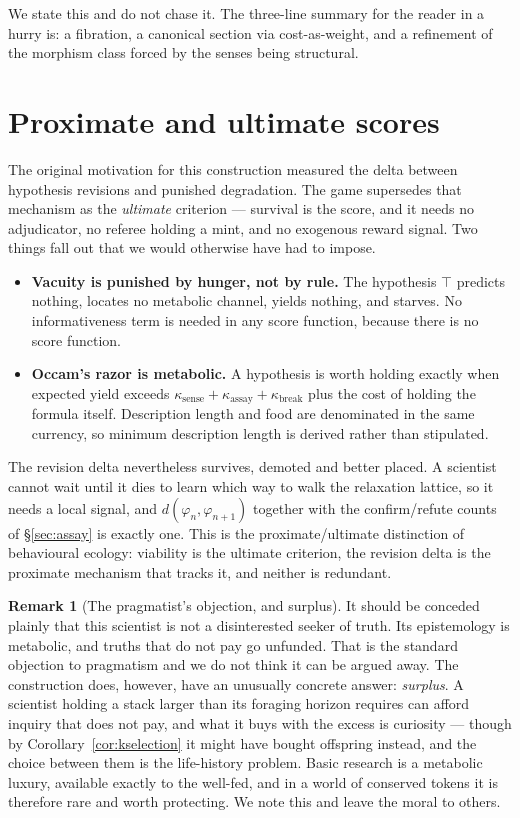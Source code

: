 \documentclass[11pt]{article}
\theoremstyle{plain}
\theoremstyle{definition}
\newtheorem{remark}[theorem]{Remark}
\begin{document}
We state this and do not chase it. The three-line summary for the reader in a hurry is: a fibration, a
canonical section via cost-as-weight, and a refinement of the morphism class forced by the senses being
structural.

\section{Proximate and ultimate scores}
\label{sec:scores}

The original motivation for this construction measured the delta between hypothesis revisions and
punished degradation. The game supersedes that mechanism as the \emph{ultimate} criterion --- survival
is the score, and it needs no adjudicator, no referee holding a mint, and no exogenous reward signal.
Two things fall out that we would otherwise have had to impose.

\begin{itemize}
\item \textbf{Vacuity is punished by hunger, not by rule.} The hypothesis $\top$ predicts nothing,
locates no metabolic channel, yields nothing, and starves. No informativeness term is needed in any
score function, because there is no score function.
\item \textbf{Occam's razor is metabolic.} A hypothesis is worth holding exactly when expected yield
exceeds $\kappa_{\mathrm{sense}} + \kappa_{\mathrm{assay}} + \kappa_{\mathrm{break}}$ plus the cost of
holding the formula itself. Description length and food are denominated in the same currency, so
minimum description length is derived rather than stipulated.
\end{itemize}

The revision delta nevertheless survives, demoted and better placed. A scientist cannot wait until it
dies to learn which way to walk the relaxation lattice, so it needs a local signal, and
$d(\varphi_n, \varphi_{n+1})$ together with the confirm/refute counts of \S\ref{sec:assay} is exactly
one. This is the proximate/ultimate distinction of behavioural ecology: viability is the ultimate
criterion, the revision delta is the proximate mechanism that tracks it, and neither is redundant.

\begin{remark}[The pragmatist's objection, and surplus]
\label{rem:pragmatist}
It should be conceded plainly that this scientist is not a disinterested seeker of truth. Its
epistemology is metabolic, and truths that do not pay go unfunded. That is the standard objection to
pragmatism and we do not think it can be argued away. The construction does, however, have an unusually
concrete answer: \emph{surplus}. A scientist holding a stack larger than its foraging horizon requires
can afford inquiry that does not pay, and what it buys with the excess is curiosity --- though by
Corollary~\ref{cor:kselection} it might have bought offspring instead, and the choice between them is
the life-history problem. Basic research is
a metabolic luxury, available exactly to the well-fed, and in a world of conserved tokens it is
therefore rare and worth protecting. We note this and leave the moral to others.
\end{remark}
\end{document}
